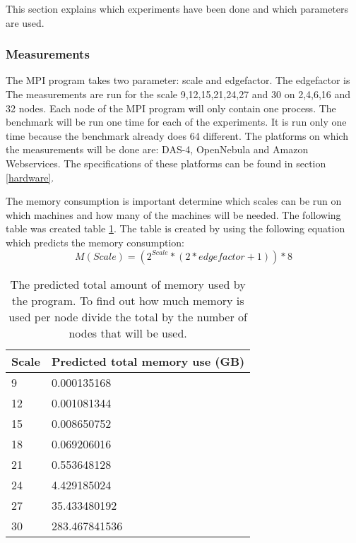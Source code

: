 This section explains which experiments have been done and which parameters are used.

\subsubsection{Measurements}
The MPI program takes two parameter: scale and edgefactor. The edgefactor is The measurements are run for the scale 9,12,15,21,24,27 and 30 on 2,4,6,16 and 32 nodes. Each node of the MPI program will only contain one process. The benchmark will be run one time for each of the experiments. It is run only one time because the benchmark already does 64 different. The platforms on which the measurements will be done are: DAS-4, OpenNebula and Amazon Webservices. The specifications of these platforms can be found in section \ref{hardware}.

The memory consumption is important determine which scales can be run on which machines and how many of the machines will be needed. The following table was created table \ref{tab:calculation memory consumption}. The table is created by using the following equation which predicts the memory consumption:
\begin{equation}
M(Scale) = (2^{Scale} *(2*edgefactor + 1)) * 8
\end{equation}
\begin{table} [!h]
	\begin{center}
		\begin{tabular}{|l|l|}
			\hline
			Scale & Predicted total memory use (GB) \\ \hline
			9 &  0.000135168 \\ \hline
			12 & 0.001081344 \\ \hline
			15 & 0.008650752 \\ \hline
			18 & 0.069206016 \\ \hline
			21 & 0.553648128 \\ \hline
			24 & 4.429185024 \\ \hline
			27 & 35.433480192 \\ \hline
			30 & 283.467841536 \\ \hline
		\end{tabular}
	\end{center}
	
	\caption{The predicted total amount of memory used by the program. To find out how much memory is used per node divide the total by the number of nodes that will be used.}
	\label{tab:calculation memory consumption}
\end{table}


